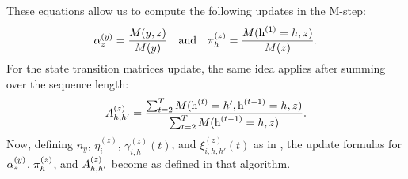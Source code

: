 \endgroup
These equations allow us to compute the following updates in the M-step:
\begin{align}
	{\alpha}^{(y)}_z = \frac{M(y,z)}{M(y)} \quad \text{and} \quad {\pi}^{(z)}_h = \frac{M({\textnormal{h}}^{(1)}=h, z)}{M(z)}.
\end{align}
For the state transition matrices update, the same idea applies after summing over the sequence length:
\begin{equation}
	{A}^{(z)}_{h,h'} = \frac{\sum_{t=2}^T M({\textnormal{h}}^{(t)}=h', {\textnormal{h}}^{(t-1)}=h, z)}{\sum_{t=2}^T M({\textnormal{h}}^{(t-1)}=h, z)}.
\end{equation}
Now, defining $n_y$, $\eta^{(z)}_i$, $\gamma^{(z)}_{i,h}(t)$, and $\xi^{(z)}_{i,h,h'}(t)$ as in , the update formulas for ${\alpha}^{(y)}_z$, ${\pi}^{(z)}_h$, and ${A}^{(z)}_{h,h'}$ become as defined in that algorithm.

